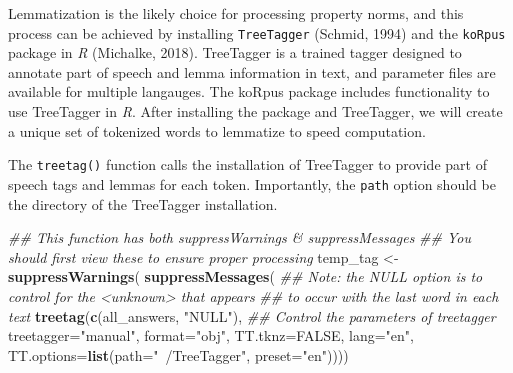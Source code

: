 \documentclass[man]{apa6}
\newenvironment{Shaded}{\begin{snugshade}}{\end{snugshade}}
\newcommand{\CommentTok}[1]{\textcolor[rgb]{0.56,0.35,0.01}{\textit{#1}}}
\newcommand{\DataTypeTok}[1]{\textcolor[rgb]{0.13,0.29,0.53}{#1}}
\newcommand{\KeywordTok}[1]{\textcolor[rgb]{0.13,0.29,0.53}{\textbf{#1}}}
\newcommand{\NormalTok}[1]{#1}
\newcommand{\OperatorTok}[1]{\textcolor[rgb]{0.81,0.36,0.00}{\textbf{#1}}}
\newcommand{\OtherTok}[1]{\textcolor[rgb]{0.56,0.35,0.01}{#1}}
\newcommand{\StringTok}[1]{\textcolor[rgb]{0.31,0.60,0.02}{#1}}
\begin{document}
Lemmatization is the likely choice for processing property norms, and this process can be achieved by installing \texttt{TreeTagger} (Schmid, 1994) and the \texttt{koRpus} package in \emph{R} (Michalke, 2018). TreeTagger is a trained tagger designed to annotate part of speech and lemma information in text, and parameter files are available for multiple langauges. The koRpus package includes functionality to use TreeTagger in \emph{R}. After installing the package and TreeTagger, we will create a unique set of tokenized words to lemmatize to speed computation.

\scriptsize

\begin{Shaded}
\end{Shaded}

\normalsize

The \texttt{treetag()} function calls the installation of TreeTagger to provide part of speech tags and lemmas for each token. Importantly, the \texttt{path} option should be the directory of the TreeTagger installation.

\scriptsize

\begin{Shaded}
\begin{Highlighting}[]
\CommentTok{## This function has both suppressWarnings & suppressMessages}
\CommentTok{## You should first view these to ensure proper processing}
\NormalTok{temp_tag <-}\StringTok{ }\KeywordTok{suppressWarnings}\NormalTok{(}
  \KeywordTok{suppressMessages}\NormalTok{(}
    \CommentTok{## Note: the NULL option is to control for the <unknown> that appears}
    \CommentTok{## to occur with the last word in each text}
    \KeywordTok{treetag}\NormalTok{(}\KeywordTok{c}\NormalTok{(all_answers, }\StringTok{"NULL"}\NormalTok{), }
            \CommentTok{## Control the parameters of treetagger}
            \DataTypeTok{treetagger=}\StringTok{"manual"}\NormalTok{, }\DataTypeTok{format=}\StringTok{"obj"}\NormalTok{,}
            \DataTypeTok{TT.tknz=}\OtherTok{FALSE}\NormalTok{, }\DataTypeTok{lang=}\StringTok{"en"}\NormalTok{,}
            \DataTypeTok{TT.options=}\KeywordTok{list}\NormalTok{(}\DataTypeTok{path=}\StringTok{"~/TreeTagger"}\NormalTok{, }\DataTypeTok{preset=}\StringTok{"en"}\NormalTok{))))}
\end{Highlighting}
\end{Shaded}
\end{document}
